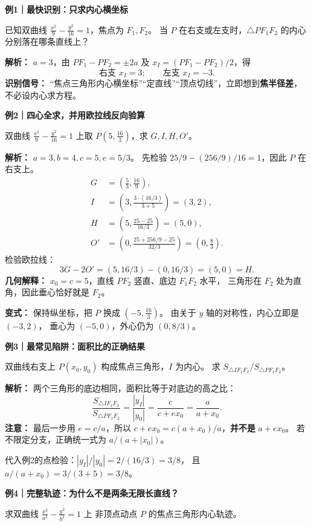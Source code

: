 \begin{examplebox}
\textbf{例1｜最快识别：只求内心横坐标}

已知双曲线 $\frac{x^2}{9}-\frac{y^2}{16}=1$，焦点为 $F_1,F_2$。
当 $P$ 在右支或左支时，$\triangle PF_1F_2$ 的内心分别落在哪条直线上？

\textbf{解析：} $a=3$，由 $PF_1-PF_2=\pm2a$ 及
$x_I=(PF_1-PF_2)/2$，得
\[
\boxed{\text{右支 }x_I=3;\qquad \text{左支 }x_I=-3.}
\]
\textbf{识别信号：} “焦点三角形内心横坐标”“定直线”“顶点切线”，立即想到\textbf{焦半径差}，不必设内心求方程。

\tcbline
\textbf{例2｜四心全求，并用欧拉线反向验算}

双曲线 $\frac{x^2}{9}-\frac{y^2}{16}=1$ 上取
$P\left(5,\frac{16}{3}\right)$，求 $G,I,H,O'$。

\textbf{解析：} $a=3,b=4,c=5,e=5/3$。
先检验 $25/9-(256/9)/16=1$，因此 $P$ 在右支上。
\begin{align*}
G&=\left(\frac53,\frac{16}{9}\right),\\
I&=\left(3,\frac{3\cdot(16/3)}{3+5}\right)=(3,2),\\
H&=\left(5,\frac{25-25}{16/3}\right)=(5,0),\\
O'&=\left(0,\frac{25+256/9-25}{32/3}\right)
=\left(0,\frac83\right).
\end{align*}
检验欧拉线：
\[
3G-2O'=(5,16/3)-(0,16/3)=(5,0)=H.
\]
\textbf{几何解释：} $x_0=c=5$，直线 $PF_2$ 竖直、底边 $F_1F_2$ 水平，
三角形在 $F_2$ 处为直角，因此垂心恰好就是 $F_2$。

\textbf{变式：} 保持纵坐标，把 $P$ 换成 $\left(-5,\frac{16}{3}\right)$。
由关于 $y$ 轴的对称性，内心立即是 $\boxed{(-3,2)}$，
垂心为 $(-5,0)$，外心仍为 $(0,8/3)$。

\tcbline
\textbf{例3｜最常见陷阱：面积比的正确结果}

双曲线右支上 $P(x_0,y_0)$ 构成焦点三角形，$I$ 为内心。
求 $S_{\triangle IF_1F_2}/S_{\triangle PF_1F_2}$。

\textbf{解析：} 两个三角形的底边相同，面积比等于对底边的高之比：
\[
\frac{S_{\triangle IF_1F_2}}{S_{\triangle PF_1F_2}}
=\frac{|y_I|}{|y_0|}
=\frac{c}{c+ex_0}
=\boxed{\frac{a}{a+x_0}}.
\]
\textbf{注意：} 最后一步用 $e=c/a$，所以
$c+ex_0=c(a+x_0)/a$，\textbf{并不是} $a+ex_0$。
若不限定分支，正确统一式为 $\boxed{a/(a+|x_0|)}$。

代入例2的点检验：$|y_I|/|y_0|=2/(16/3)=3/8$，
且 $a/(a+x_0)=3/(3+5)=3/8$。

\tcbline
\textbf{例4｜完整轨迹：为什么不是两条无限长直线？}

求双曲线 $\frac{x^2}{a^2}-\frac{y^2}{b^2}=1$ 上
非顶点动点 $P$ 的焦点三角形内心轨迹。


\end{examplebox}
